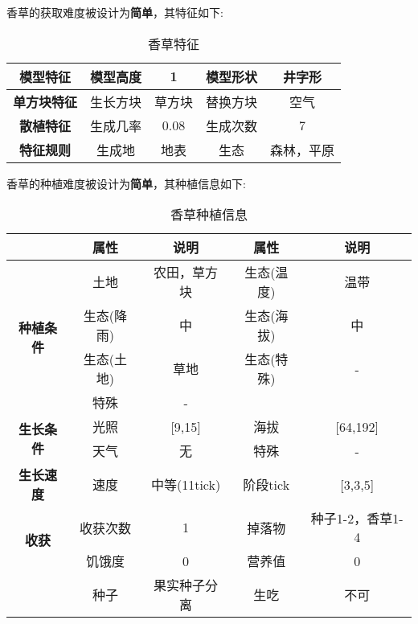 香草的获取难度被设计为\textbf{简单}，其特征如下:
\begin{table}[H]
    \centering
    \caption{香草特征}
    \label{table:香草特征}
    \setlength{\tabcolsep}{4mm}
    \begin{tabular}{c|cc|cc}
        \toprule
        \textbf{模型特征}   & 模型高度 & 1      & 模型形状 & 井字形     \\
        \midrule
        \textbf{单方块特征} & 生长方块 & 草方块 & 替换方块 & 空气       \\
        \midrule
        \textbf{散植特征}   & 生成几率 & 0.08   & 生成次数 & 7          \\
        \midrule
        \textbf{特征规则}   & 生成地   & 地表   & 生态     & 森林，平原 \\
        \bottomrule
    \end{tabular}
\end{table}


香草的种植难度被设计为\textbf{简单}，其种植信息如下:

\begin{table}[H]
    \centering
    \caption{香草种植信息}
    \label{table:香草种植信息}
    \setlength{\tabcolsep}{4mm}
    \begin{tabular}{c|cc|cc}
        \toprule
                                           & \textbf{属性} & \textbf{说明} & \textbf{属性} & \textbf{说明}    \\
        \midrule
        \multirow{4}{*}{\textbf{种植条件}} & 土地          & 农田，草方块  & 生态(温度)    & 温带             \\
                                           & 生态(降雨)    & 中            & 生态(海拔)    & 中               \\
                                           & 生态(土地)    & 草地          & 生态(特殊)    & -                \\
                                           & 特殊          & -                                                \\
        \midrule
        \multirow{2}{*}{\textbf{生长条件}} & 光照          & [9,15]        & 海拔          & [64,192]         \\
                                           & 天气          & 无            & 特殊          & -                \\
        \midrule
        \textbf{生长速度}                  & 速度          & 中等(11tick)  & 阶段tick      & [3,3,5]          \\
        \midrule
        \multirow{2}{*}{\textbf{收获}}     & 收获次数      & 1             & 掉落物        & 种子1-2，香草1-4 \\
                                           & 饥饿度        & 0             & 营养值        & 0                \\
                                           & 种子          & 果实种子分离  & 生吃          & 不可             \\
        \bottomrule
    \end{tabular}
\end{table}

